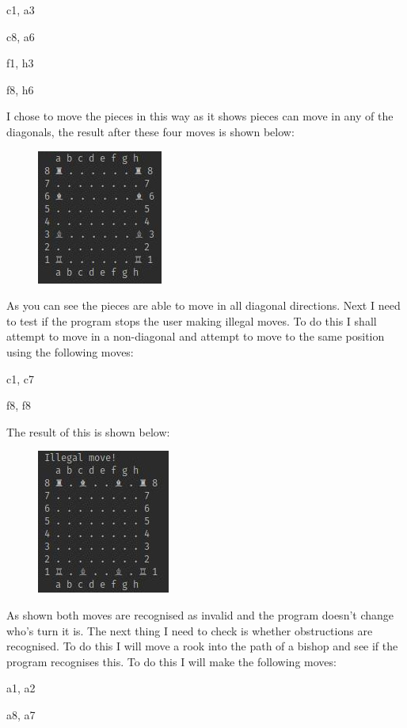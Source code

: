 \documentclass[a4paper]{article}
\begin{document}
\noindent c1, a3

\noindent c8, a6

\noindent f1, h3

\noindent f8, h6

I chose to move the pieces in this way as it shows pieces can move in any of the diagonals, the result after these four moves is shown below:
\begin{figure}[h]
\centering
\includegraphics[scale=2.5]{bishopsMoving}
\end{figure}
As you can see the pieces are able to move in all diagonal directions. Next I need to test if the program stops the user making illegal moves. To do this I shall attempt to move in a non-diagonal and attempt to move to the same position using the following moves:

\noindent c1, c7

\noindent f8, f8

The result of this is shown below:
\begin{figure}[h]
\centering
\includegraphics[scale=2.5]{illegal}
\end{figure}

As shown both moves are recognised as invalid and the program doesn't change who's turn it is. The next thing I need to check is whether obstructions are recognised. To do this I will move a rook into the path of a bishop and see if the program recognises this. To do this I will make the following moves:

\noindent a1, a2

\noindent a8, a7
\end{document}
